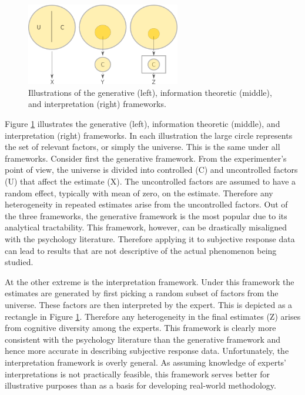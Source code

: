 \documentclass[11pt,twoside]{article}
\begin{document}
\begin{figure}[htbp]
   \centering
   \includegraphics[width = 0.6\textwidth]{regression} %
   \caption{Illustrations of the generative (left), information theoretic (middle), and interpretation (right) frameworks.}
   \label{framework}
\end{figure}


Figure \ref{framework} illustrates the generative (left), information theoretic (middle), and interpretation (right) frameworks. In each illustration the large circle represents the set of relevant factors, or simply the universe. This is the same under all frameworks. Consider first the generative framework. From the experimenter's point of view, the universe is divided into controlled (C) and uncontrolled factors (U) that affect the estimate (X). The uncontrolled factors are assumed to have a random effect, typically with mean of zero, on the estimate. Therefore any heterogeneity in repeated estimates arise from the uncontrolled factors. Out of the three frameworks, the generative framework is the most popular due to its analytical tractability. This framework, however, can be drastically misaligned with the psychology literature. Therefore applying it to subjective response data can lead to results that are not descriptive of the actual phenomenon being studied.


At the other extreme is the interpretation framework. Under this framework the estimates are generated by first picking a random subset of factors from the universe. These factors are then interpreted by the expert. This is depicted as a rectangle in Figure \ref{framework}. Therefore any heterogeneity in the final estimates (Z)  arises from cognitive diversity among the experts. This framework is clearly more consistent with the psychology literature than the generative framework and hence more accurate in describing subjective response data. Unfortunately, the interpretation framework is overly general. As assuming  knowledge of experts' interpretations is not practically feasible, this framework serves better for illustrative purposes than as a basis for developing real-world methodology.
\end{document}
